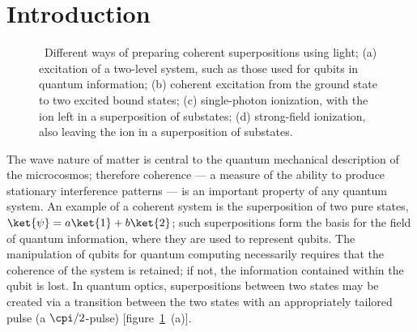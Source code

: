 \section{Introduction}
\label{sec:introduction}
\begin{figure}[tb]
  \centering
  
  \caption{\label{fig:comp-systems}~Different ways of preparing
    coherent superpositions using light; (a) excitation of a two-level
    system, such as those used for qubits in quantum information; (b)
    coherent excitation from the ground state to two excited bound
    states; (c) single-photon ionization, with the ion left in a
    superposition of substates; (d) strong-field ionization, also
    leaving the ion in a superposition of substates.}
\end{figure}
The wave nature of matter is central to the quantum mechanical
description of the microcosmos; therefore coherence --- a measure of the
ability to produce stationary interference patterns --- is an important
property of any quantum system. An example of a coherent system is the
superposition of two pure states,
\(\ket{\psi} = a\ket{1} + b\ket{2}\); such superpositions form the basis
for the field of quantum information, where they are used to represent
qubits. The manipulation of qubits for quantum computing necessarily
requires that the coherence of the system is retained; if not, the
information contained within the qubit is lost. In quantum optics,
superpositions between two states may be created via a transition
between the two states with an appropriately tailored pulse (\eg a
\(\cpi/2\)-pulse) [figure~\ref{fig:comp-systems}~(a)].

